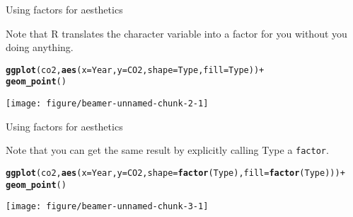 \documentclass[table]{beamer}\usepackage[]{graphicx}\usepackage[]{color}
\makeatletter
\def\maxwidth{ %
  \ifdim\Gin@nat@width>\linewidth
    \linewidth
  \else
    \Gin@nat@width
  \fi
}
\newcommand{\hlopt}[1]{\textcolor[rgb]{0,0,0}{#1}}%
\newcommand{\hlstd}[1]{\textcolor[rgb]{0.345,0.345,0.345}{#1}}%
\newcommand{\hlkwc}[1]{\textcolor[rgb]{0.333,0.667,0.333}{#1}}%
\newcommand{\hlkwd}[1]{\textcolor[rgb]{0.737,0.353,0.396}{\textbf{#1}}}%
\newenvironment{kframe}{%
 \def\at@end@of@kframe{}%
 \ifinner\ifhmode%
  \def\at@end@of@kframe{\end{minipage}}%
  \begin{minipage}{\columnwidth}%
 \fi\fi%
 \def\FrameCommand##1{\hskip\@totalleftmargin \hskip-\fboxsep
 \colorbox{shadecolor}{##1}\hskip-\fboxsep
     \hskip-\linewidth \hskip-\@totalleftmargin \hskip\columnwidth}%
 \MakeFramed {\advance\hsize-\width
   \@totalleftmargin\z@ \linewidth\hsize
   \@setminipage}}%
 {\par\unskip\endMakeFramed%
 \at@end@of@kframe}
\newenvironment{knitrout}{}{} %
\makeatother
\begin{document}

\begin{frame}[fragile]{Using factors for aesthetics}

Note that R translates the character variable into a factor for you without you doing anything.

\begin{knitrout}\tiny
{}\color{fgcolor}\begin{kframe}
\begin{alltt}
\hlkwd{ggplot}\hlstd{(co2,} \hlkwd{aes}\hlstd{(}\hlkwc{x} \hlstd{= Year,} \hlkwc{y} \hlstd{= CO2,} \hlkwc{shape} \hlstd{= Type,} \hlkwc{fill} \hlstd{= Type))}\hlopt{+}
  \hlkwd{geom_point}\hlstd{()}
\end{alltt}
\end{kframe}

{\centering \texttt{[image: figure/beamer-unnamed-chunk-2-1]} 

}



\end{knitrout}

\end{frame}


\begin{frame}[fragile]{Using factors for aesthetics}

Note that you can get the same result by explicitly calling Type a {\tt factor}.

\begin{knitrout}\tiny
{}\color{fgcolor}\begin{kframe}
\begin{alltt}
\hlkwd{ggplot}\hlstd{(co2,} \hlkwd{aes}\hlstd{(}\hlkwc{x} \hlstd{= Year,} \hlkwc{y} \hlstd{= CO2,} \hlkwc{shape} \hlstd{=} \hlkwd{factor}\hlstd{(Type),} \hlkwc{fill} \hlstd{=} \hlkwd{factor}\hlstd{(Type)))}\hlopt{+}
  \hlkwd{geom_point}\hlstd{()}
\end{alltt}
\end{kframe}

{\centering \texttt{[image: figure/beamer-unnamed-chunk-3-1]} 

}



\end{knitrout}

\end{frame}
\end{document}
